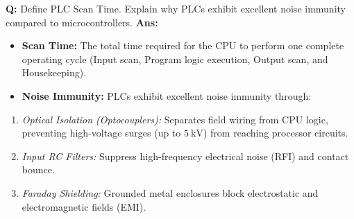 \documentclass[10pt,a4paper,twocolumn]{article}
\begin{document}
\begin{tcolorbox}[
  colback=white,
  colframe=UnitColorThree,
  colbacktitle=gray!10!white,
  coltitle=black,
  fonttitle=\bfseries\sffamily\small,
  title={Unit III $\bullet$ Card 15: PLC Scan Time \& Noise Immunity (Q3.5)},
  boxrule=1.2pt,
  arc=2mm,
  outer arc=2mm,
  boxsep=1.5mm,
  top=1mm,
  bottom=1mm,
  left=1.5mm,
  right=1.5mm,
  before skip=2.5mm,
  after skip=2.5mm
]
\textbf{Q:} Define PLC Scan Time. Explain why PLCs exhibit excellent noise immunity compared to microcontrollers.
\tcbline
\textbf{Ans:} \begin{itemize}
  \item   \textbf{Scan Time:} The total time required for the CPU to perform one complete operating cycle (Input scan, Program logic execution, Output scan, and Housekeeping).
  \item   \textbf{Noise Immunity:} PLCs exhibit excellent noise immunity through:
\end{itemize}
\begin{enumerate}
  \item \textit{Optical Isolation (Optocouplers):} Separates field wiring from CPU logic, preventing high-voltage surges (up to $5\ \text{kV}$) from reaching processor circuits.
  \item \textit{Input RC Filters:} Suppress high-frequency electrical noise (RFI) and contact bounce.
  \item \textit{Faraday Shielding:} Grounded metal enclosures block electrostatic and electromagnetic fields (EMI).
\end{enumerate}
\end{tcolorbox}
\end{document}
